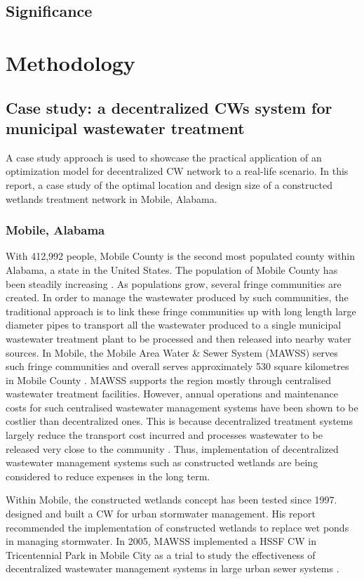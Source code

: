 \documentclass[preprint,12pt,authoryear]{elsarticle}
\begin{document}
\subsection{Significance}

\section{Methodology}\label{section:method}
\subsection{Case study: a decentralized CWs system for municipal wastewater treatment}
A case study approach is used to showcase the practical application of an optimization model for decentralized CW network to a real-life scenario. In this report, a case study of the optimal location and design size of a constructed wetlands treatment network in Mobile, Alabama.

\subsubsection{Mobile, Alabama}
With 412,992 people, Mobile County is the second most populated county within Alabama, a state in the United States. The population of Mobile County has been steadily increasing \citep{uscb2002census}. As populations grow, several fringe communities are created. In order to manage the wastewater produced by such communities, the traditional approach is to link these fringe communities up with long length large diameter pipes to transport all the wastewater produced to a single municipal wastewater treatment plant to be processed and then released into nearby water sources. In Mobile, the Mobile Area Water \& Sewer System (MAWSS) serves such fringe communities and overall serves approximately 530 square kilometres in Mobile County \citep{mawss2015}. MAWSS supports the region mostly through centralised wastewater treatment facilities. However, annual operations and maintenance costs for such centralised wastewater management systems have been shown to be costlier than decentralized ones. This is because decentralized treatment systems largely reduce the transport cost incurred and processes wastewater to be released very close to the community \citep{mawss2015}. Thus, implementation of decentralized wastewater management systems such as constructed wetlands are being considered to reduce expenses in the long term. 

Within Mobile, the constructed wetlands concept has been tested since 1997. \cite{surrency1997} designed and built a CW for urban stormwater management. His report recommended the implementation of constructed wetlands to replace wet ponds in managing stormwater. In 2005, MAWSS implemented a HSSF CW in Tricentennial Park in Mobile City as a trial to study the effectiveness of decentralized wastewater management systems in large urban sewer systems \cite{mawss2005}.
\end{document}
